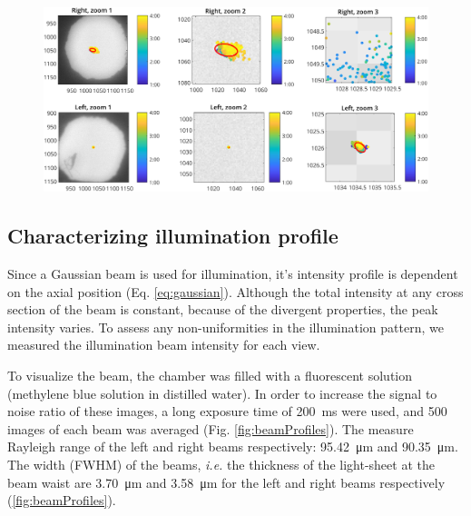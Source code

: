     \begin{figure}
      \centering
      \includegraphics[width=\textwidth]{trackCenter}
      \label{fig:stability}
    \end{figure}

  \subsection{Characterizing illumination profile}
    Since a Gaussian beam is used for illumination, it's intensity profile is dependent on the axial position (Eq. \ref{eq:gaussian}). Although the total intensity at any cross section of the beam is constant, because of the divergent properties, the peak intensity varies. To assess any non-uniformities in the illumination pattern, we measured the illumination beam intensity for each view.

    To visualize the beam, the chamber was filled with a fluorescent solution (methylene blue solution in distilled water). In order to increase the signal to noise ratio of these images, a long exposure time of \SI{200}{ms} were used, and 500 images of each beam was averaged (Fig. \ref{fig:beamProfiles}). The measure Rayleigh range of the left and right beams respectively: \SI{95.42}{\micro m} and \SI{90.35}{\micro m}. The width (FWHM) of the beams, \textit{i.e.} the thickness of the light-sheet at the beam waist are \SI{3.70}{\micro m} and \SI{3.58}{\micro m} for the left and right beams respectively (\autoref{fig:beamProfiles}).

